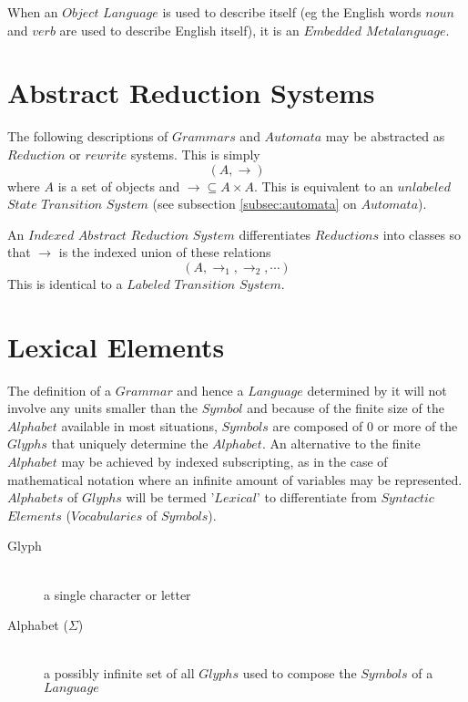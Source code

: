 \documentclass{article}
\begin{document}
When an $Object$ $Language$ is used to describe itself (eg the English
words $noun$ and $verb$ are used to describe English itself), it is
an $Embedded$ $Metalanguage$.


\section{Abstract Reduction Systems}
The following descriptions of $Grammars$ and $Automata$ may be
abstracted as $Reduction$ or $rewrite$ systems. This is simply
    \[(A,\rightarrow)\]
where $A$ is a set of objects and $\rightarrow \subseteq A \times
A$. This is equivalent to an $unlabeled$ $State$ $Transition$ $System$
(see subsection \ref{subsec:automata} on $Automata$).

An $Indexed$ $Abstract$ $Reduction$ $System$ differentiates
$Reductions$ into classes so that $\rightarrow$ is the indexed union
of these relations
    \[(A, \rightarrow_1, \rightarrow_2, \cdots)\]
This is identical to a $Labeled$ $Transition$ $System$.


\section{Lexical Elements}

The definition of a $Grammar$ and hence a $Language$ determined by it
will not involve any units smaller than the $Symbol$ and because of
the finite size of the $Alphabet$ available in most situations,
$Symbols$ are composed of 0 or more of the $Glyphs$ that uniquely
determine the $Alphabet$. An alternative to the finite $Alphabet$ may
be achieved by indexed subscripting, as in the case of mathematical
notation where an infinite amount of variables may be
represented. $Alphabets$ of $Glyphs$ will be termed '$Lexical$' to
differentiate from $Syntactic$ $Elements$ ($Vocabularies$ of
$Symbols$).

    \begin{description}

    \item[Glyph] \hfill \\
    a single character or letter

    \item[Alphabet ($\Sigma$)] \hfill \\
    a possibly infinite set of all $Glyphs$ used to compose the
    $Symbols$ of a $Language$

    \end{description}
\end{document}
